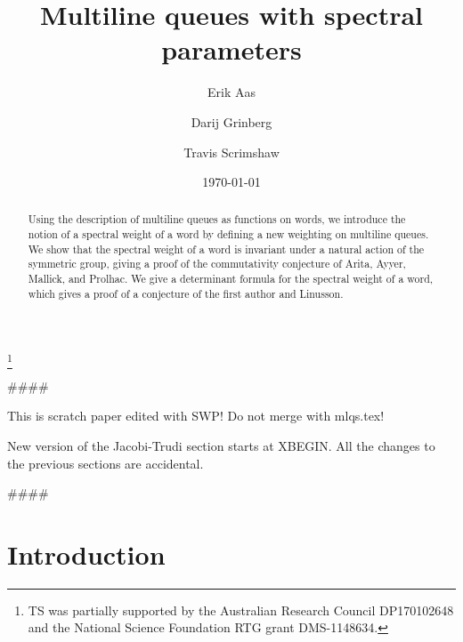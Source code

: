 \documentclass[reqno]{amsart}%
\newcommand{\0}{\phantom{c}}
\theoremstyle{plain}
\theoremstyle{definition}
\numberwithin{equation}{section}
\begin{document}
\title[MLQs]{Multiline queues with spectral parameters}
\author[E.~Aas]{Erik Aas}
\address[E. Aas]{Department of Mathematics, Pennsylvania State University, McAllister
Building, State College, PA 116802, USA}
\author[D.~Grinberg]{Darij Grinberg}
\address[D. Grinberg]{School of Mathematics, University of Minnesota, 206 Church St.
SE, Minneapolis, MN 55455}
\author[T.~Scrimshaw]{Travis Scrimshaw}
\address[T. Scrimshaw]{School of Mathematics and Physics, The University of Queensland,
St. Lucia, QLD 4072, Australia}
\thanks{TS was partially supported by the Australian Research Council DP170102648 and
the National Science Foundation RTG grant DMS-1148634.}
\date{\today}

\begin{abstract}
Using the description of multiline queues as functions on words, we introduce
the notion of a spectral weight of a word by defining a new weighting on
multiline queues. We show that the spectral weight of a word is invariant
under a natural action of the symmetric group, giving a proof of the
commutativity conjecture of Arita, Ayyer, Mallick, and Prolhac. We give a
determinant formula for the spectral weight of a word, which gives a proof of
a conjecture of the first author and Linusson.

\end{abstract}
\maketitle


\#\#\#\#

This is scratch paper edited with SWP! Do not merge with mlqs.tex!

New version of the Jacobi-Trudi section starts at XBEGIN. All the changes to
the previous sections are accidental.

\#\#\#\#





\section{Introduction}
\end{document}

